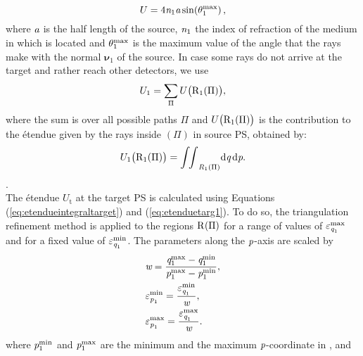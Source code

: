 \begin{equation}\label{eq:etenduesource}
U = 4\textit{n}_1 \textit{a} \sin(\theta_1^{\textrm{max}})\,,
\end{equation}
 where $\textit{a}$ is the half length of the source, $\textit{n}_1$ the index of refraction of the medium in which  is located and $\theta_1^{\textrm{max}}$ is the maximum value of the angle that the rays make with the normal $\boldsymbol{\nu}_1$ of the source.
In case some rays do not arrive at the target and rather reach other detectors, we use
\begin{equation}\label{eq:etenduesumsource}
U_1 = \sum_\Pi{U\big(\mbox{$\textup{R}_{\textit{$1$}}$}(\Pi)\big)},
\end{equation}
where the sum is over all possible paths $\Pi$ and $U\big(\mbox{$\textup{R}_{\textit{$1$}}$}(\Pi)\big)$ is the contribution to the \'{e}tendue given by the rays inside $(\Pi)$ in source PS, obtained by:
\begin{equation}\label{eq:etendueintegralsource}
U_1\big(\mbox{$\textup{R}_{\textit{$1$}}$}(\Pi)\big) = {\int\!\!\int}_{\emph{R}_1(\Pi)} \textrm{d}\textit{q}\,\textrm{d}\textit{p}.
\end{equation}. 
\\ \indent The \'{e}tendue $U_{\textrm{t}}$ at the target PS  is calculated using Equations (\ref{eq:etendueintegraltarget}) and (\ref{eq:etenduetarg1}).
To do so, the triangulation refinement method is applied to the regions $\mbox{$\textup{R}_{\textit{}}$}(\Pi)$ for a range of values of $\varepsilon_{\textit{q}_1}^{\textrm{max}}$ and for a fixed value of $\varepsilon_{\textit{q}_1}^{\textrm{min}}$. The parameters along the $\textit{p}$-axis are scaled by 
\begin{equation}\label{eq:scaled_parameters}
\begin{aligned}
& \textit{w} = \frac{\textit{q}_1^{\textrm{max}}-\textit{q}_1^{\textrm{min}}}{\textit{p}_1^{\textrm{max}}-\textit{p}_1^{\textrm{min}}},\\
&\varepsilon_{\textit{p}_1}^{\textrm{min}}= \frac{\varepsilon_{\textit{q}_1}^{\textrm{min}}}{\textit{w}}, \\
&\varepsilon_{\textit{p}_1}^{\textrm{max}}= \frac{\varepsilon_{\textit{q}_1}^{\textrm{max}}}{\textit{w}}.
\end{aligned}
\end{equation}
 where 
$\textit{p}_1^{\textrm{min}}$ and $\textit{p}_1^{\textrm{max}}$ are the minimum and the maximum $\textit{p}$-coordinate in , and 

